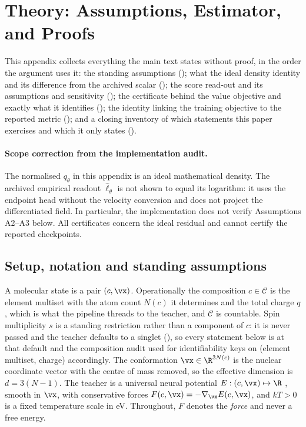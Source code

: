 \section{Theory: Assumptions, Estimator, and Proofs}
\label{app:proofs}

This appendix collects everything the main text states without proof, in the order
the argument uses it: the standing assumptions (); what the
ideal density identity and its difference from the archived scalar (); the
score read-out and its assumptions and sensitivity (); the certificate behind the value objective and
exactly what it identifies (); the identity linking
the training objective to the reported metric (); and a closing
inventory of which statements this paper exercises and which it only states
().

\paragraph{Scope correction from the implementation audit.}
The normalised $q_\theta$ in this appendix is an ideal mathematical density.
The archived empirical readout $\widehat\ell_\theta$ is not shown to equal its logarithm:
it uses the endpoint head without the velocity conversion and does not project the differentiated
field. In particular, the implementation does not verify Assumptions A2--A3 below.
All certificates concern the ideal residual and cannot certify the reported checkpoints.

\subsection{Setup, notation and standing assumptions}
\label{app:setup}

A molecular state is a pair $(c,\vx)$. Operationally the composition $c \in \mathcal{C}$ is the
element multiset with the atom count $N(c)$ it determines and the total charge
$q$, which is what the pipeline threads to the teacher, and $\mathcal{C}$ is
countable. Spin multiplicity $s$ is a standing restriction rather than a
component of $c$: it is never passed and the teacher defaults to a singlet
(), so every statement below is at that default and the
composition audit used for identifiability keys on (element multiset, charge)
accordingly. The conformation
$\vx \in \R^{3N(c)}$ is the nuclear coordinate vector with the centre of mass
removed, so the effective dimension is $d = 3(N-1)$. The teacher is a universal
neural potential $E : (c,\vx) \mapsto \R$ \citep{omol25,esen},
smooth in $\vx$, with conservative forces $F(c,\vx) = -\nabla_{\vx} E(c,\vx)$,
and $kT>0$ is a fixed temperature scale in eV. Throughout, $F$ denotes the
\emph{force} and never a free energy.

